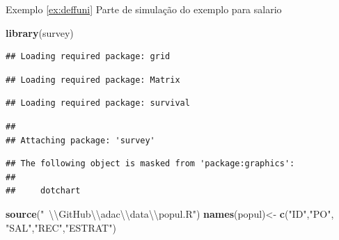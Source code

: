 \documentclass[]{book}
\newenvironment{Shaded}{\begin{snugshade}}{\end{snugshade}}
\newcommand{\KeywordTok}[1]{\textcolor[rgb]{0.13,0.29,0.53}{\textbf{{#1}}}}
\newcommand{\DecValTok}[1]{\textcolor[rgb]{0.00,0.00,0.81}{{#1}}}
\newcommand{\CharTok}[1]{\textcolor[rgb]{0.31,0.60,0.02}{{#1}}}
\newcommand{\StringTok}[1]{\textcolor[rgb]{0.31,0.60,0.02}{{#1}}}
\newcommand{\NormalTok}[1]{{#1}}
\numberwithin{example}{chapter}
\numberwithin{remark}{chapter}
\numberwithin{definition}{chapter}
\begin{document}
Exemplo \ref{ex:deffuni} Parte de simulação do exemplo para salario

\begin{Shaded}
\begin{Highlighting}[]
\KeywordTok{library}\NormalTok{(survey)}
\end{Highlighting}
\end{Shaded}

\begin{verbatim}
## Loading required package: grid
\end{verbatim}

\begin{verbatim}
## Loading required package: Matrix
\end{verbatim}

\begin{verbatim}
## Loading required package: survival
\end{verbatim}

\begin{verbatim}
## 
## Attaching package: 'survey'
\end{verbatim}

\begin{verbatim}
## The following object is masked from 'package:graphics':
## 
##     dotchart
\end{verbatim}

\begin{Shaded}
\begin{Highlighting}[]
\KeywordTok{source}\NormalTok{(}\StringTok{"~}\CharTok{\textbackslash{}\textbackslash{}}\StringTok{GitHub}\CharTok{\textbackslash{}\textbackslash{}}\StringTok{adac}\CharTok{\textbackslash{}\textbackslash{}}\StringTok{data}\CharTok{\textbackslash{}\textbackslash{}}\StringTok{popul.R"}\NormalTok{)}
\KeywordTok{names}\NormalTok{(popul)<-}\StringTok{ }\KeywordTok{c}\NormalTok{(}\StringTok{"ID"}\NormalTok{,}\StringTok{"PO"}\NormalTok{, }\StringTok{"SAL"}\NormalTok{,}\StringTok{"REC"}\NormalTok{,}\StringTok{"ESTRAT"}\NormalTok{)}
\end{Highlighting}
\end{Shaded}

\begin{Shaded}
\end{Shaded}
\end{document}
